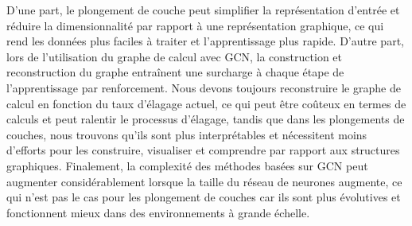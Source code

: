D'une part, le plongement de couche peut simplifier la représentation d'entrée et réduire la dimensionnalité par rapport à une représentation graphique, ce qui rend les données plus faciles à traiter et l'apprentissage plus rapide. D'autre part, lors de l'utilisation du graphe de calcul avec GCN, la construction et reconstruction du graphe entraînent une surcharge à chaque étape de l'apprentissage par renforcement. Nous devons toujours reconstruire le graphe de calcul en fonction du taux d'élagage actuel, ce qui peut être coûteux en termes de calculs et peut ralentir le processus d'élagage, tandis que dans les plongements de couches, nous trouvons qu'ils sont plus interprétables et nécessitent moins d'efforts pour les construire, visualiser et comprendre par rapport aux structures graphiques. Finalement, la complexité des méthodes basées sur GCN peut augmenter considérablement lorsque la taille du réseau de neurones augmente, ce qui n'est pas le cas pour les plongement de couches car ils sont plus évolutives et fonctionnent mieux dans des environnements à grande échelle.

